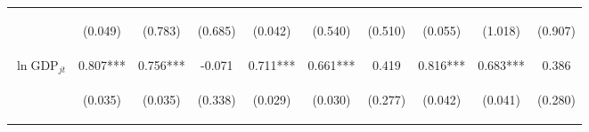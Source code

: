 \documentclass[twoside,a4paper,11pt]{article}
\begin{document}
\begin{table}
{\begin{tabular}{lccccccccc}
			 \vspace{4pt} & \begin{footnotesize}(0.049)\end{footnotesize} & \begin{footnotesize}(0.783)\end{footnotesize} & \begin{footnotesize}(0.685)\end{footnotesize} & \begin{footnotesize}(0.042)\end{footnotesize} & \begin{footnotesize}(0.540)\end{footnotesize} & \begin{footnotesize}(0.510)\end{footnotesize} & \begin{footnotesize}(0.055)\end{footnotesize} & \begin{footnotesize}(1.018)\end{footnotesize} & \begin{footnotesize}(0.907)\end{footnotesize} \\
			 $\ln\text{GDP}_{jt}$ & 0.807*** & 0.756*** & -0.071 & 0.711*** & 0.661*** & 0.419 & 0.816*** & 0.683*** & 0.386 \\
			 \vspace{4pt} & \begin{footnotesize}(0.035)\end{footnotesize} & \begin{footnotesize}(0.035)\end{footnotesize} & \begin{footnotesize}(0.338)\end{footnotesize} & \begin{footnotesize}(0.029)\end{footnotesize} & \begin{footnotesize}(0.030)\end{footnotesize} & \begin{footnotesize}(0.277)\end{footnotesize} & \begin{footnotesize}(0.042)\end{footnotesize} & \begin{footnotesize}(0.041)\end{footnotesize} & \begin{footnotesize}(0.280)\end{footnotesize} \\

\end{tabular}}
\end{table}
\end{document}
